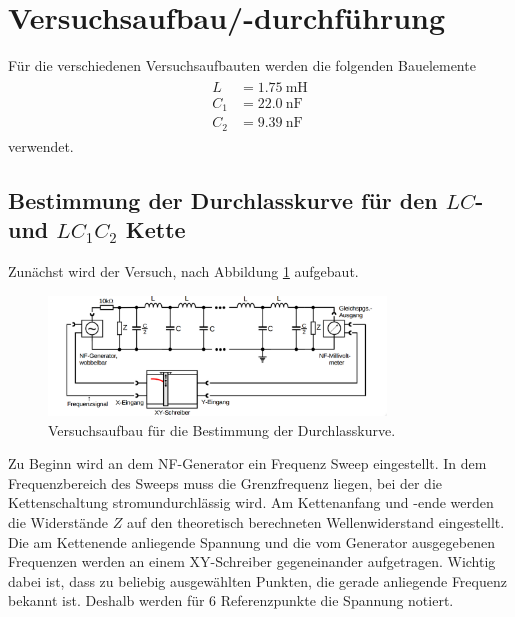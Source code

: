 \section{Versuchsaufbau/-durchführung}
Für die verschiedenen Versuchsaufbauten werden die folgenden Bauelemente
\begin{align}
\begin{aligned}
  L&=\SI{1,75}{\milli\henry}\\
  C_1&=\SI{22,0}{\nano\farad}\\
  C_2&=\SI{9,39}{\nano\farad}
\end{aligned}
\end{align}
verwendet.

\subsection{Bestimmung der Durchlasskurve für den $LC$- und $LC_1 C_2$ Kette}
Zunächst wird der Versuch, nach Abbildung \ref{fig:aufbau_durchlass} aufgebaut. %
\begin{figure}
  \centering
  \includegraphics[width=0.8\textwidth]{bilder/versuchsaufbau_1.png}
  \caption{Versuchsaufbau für die Bestimmung der Durchlasskurve.\cite{anleitung356}}
  \label{fig:aufbau_durchlass}
\end{figure}

Zu Beginn wird an dem NF-Generator ein Frequenz Sweep eingestellt.
In dem Frequenzbereich des Sweeps muss die Grenzfrequenz liegen, bei der die
Kettenschaltung stromundurchlässig wird. %
Am Kettenanfang und -ende werden die Widerstände $Z$ auf den theoretisch
berechneten Wellenwiderstand eingestellt.
Die am Kettenende anliegende Spannung und die vom Generator ausgegebenen Frequenzen
werden an einem XY-Schreiber gegeneinander aufgetragen.
Wichtig dabei ist, dass zu beliebig ausgewählten Punkten, die gerade anliegende Frequenz bekannt ist.
Deshalb werden für 6 Referenzpunkte die Spannung notiert.  %

